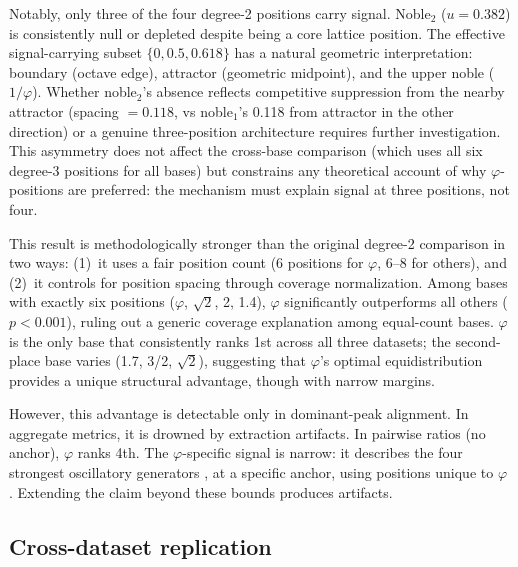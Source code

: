 \documentclass[11pt,a4paper]{article}
\newcommand{\phisym}{\varphi}
\begin{document}
Notably, only three of the four degree-2 positions carry signal. Noble$_2$ ($u = 0.382$) is consistently null or depleted despite being a core lattice position. The effective signal-carrying subset $\{0, 0.5, 0.618\}$ has a natural geometric interpretation: boundary (octave edge), attractor (geometric midpoint), and the upper noble ($1/\phisym$). Whether noble$_2$'s absence reflects competitive suppression from the nearby attractor (spacing $= 0.118$, vs noble$_1$'s 0.118 from attractor in the other direction) or a genuine three-position architecture requires further investigation. This asymmetry does not affect the cross-base comparison (which uses all six degree-3 positions for all bases) but constrains any theoretical account of why $\phisym$-positions are preferred: the mechanism must explain signal at three positions, not four.

This result is methodologically stronger than the original degree-2 comparison in two ways: (1)~it uses a fair position count (6 positions for $\phisym$, 6--8 for others), and (2)~it controls for position spacing through coverage normalization. Among bases with exactly six positions ($\phisym$, $\sqrt{2}$, 2, 1.4), $\phisym$ significantly outperforms all others ($p < 0.001$), ruling out a generic coverage explanation among equal-count bases. $\phisym$ is the only base that consistently ranks 1st across all three datasets; the second-place base varies (1.7, 3/2, $\sqrt{2}$), suggesting that $\phisym$'s optimal equidistribution provides a unique structural advantage, though with narrow margins.

However, this advantage is detectable only in dominant-peak alignment. In aggregate metrics, it is drowned by extraction artifacts. In pairwise ratios (no anchor), $\phisym$ ranks 4th. The $\phisym$-specific signal is narrow: it describes the four strongest oscillatory generators \parencite{Buzsaki2004}, at a specific anchor, using positions unique to $\phisym$ \parencite{Pletzer2010, Kramer2022, Izhikevich1997}. Extending the claim beyond these bounds produces artifacts.

\subsection{Cross-dataset replication}
\end{document}
